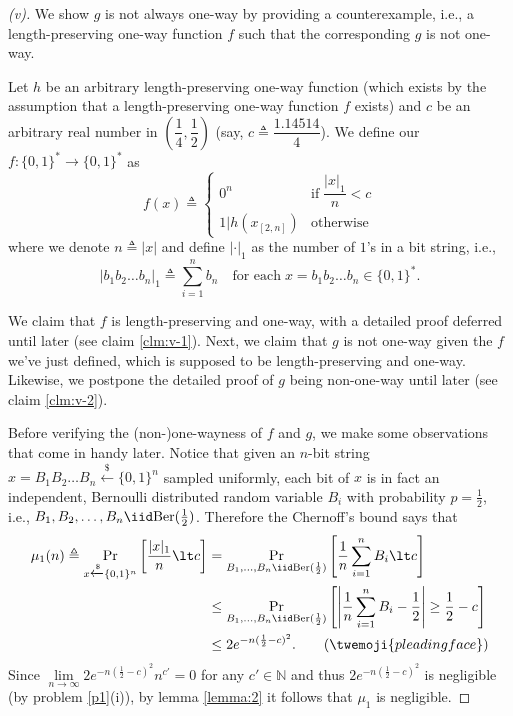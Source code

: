 \begin{proof}[(v)]
    We show $g$ is not always one-way by providing a counterexample, i.e., a length-preserving one-way function $f$ such that the corresponding $g$ is not one-way.
    
    Let $h$ be an arbitrary length-preserving one-way function (which exists by the assumption that a length-preserving one-way function $f$ exists) and $c$ be an arbitrary real number in $\left(\dfrac{1}{4},\dfrac{1}{2}\right)$ (say, $c\triangleq \dfrac{1.14514}{4}$). We define our $f:\{0,1\}^\ast\to \{0,1\}^\ast$ as
    \[
    f(x)\triangleq \begin{cases}
        0^{n} & \text{if}\; \dfrac{|x|_1}{n} \lt c \\
        1|h(x_{[2,n]}) & \text{otherwise}
    \end{cases}
    \]
    where we denote $n\triangleq |x|$ and define $|\cdot |_1$ as the number of $1$'s in a bit string, i.e.,
    \[
    |b_1b_2\ldots b_n|_1 \triangleq \sum_{i=1}^n b_n\quad \text{for each}\; x=b_1b_2\ldots b_n\in \{0,1\}^\ast.
    \]

    
    
    We claim that $f$ is length-preserving and one-way, with a detailed proof deferred until later (see claim \ref{clm:v-1}). Next, we claim that $g$ is not one-way given the $f$ we've just defined, which is supposed to be length-preserving and one-way. Likewise, we postpone the detailed proof of $g$ being non-one-way until later (see claim \ref{clm:v-2}).
    
    
    Before verifying the (non-)one-wayness of $f$ and $g$, we make some observations that come in handy later. Notice that given an $n$-bit string $x=B_1B_2\ldots B_n\xleftarrow{\$}\{0,1\}^n$ sampled uniformly, each bit of $x$ is in fact an independent, Bernoulli distributed random variable $B_i$ with probability $p=\frac{1}{2}$, i.e., $B_1,B_2,\ldots, B_n \iid \mathrm{Ber}(\frac{1}{2})$. Therefore the Chernoff's bound says that
    \begin{align*}
    \mu_1(n)\triangleq \Pr\limits_{x\xleftarrow{\$}\{0,1\}^n}\left[\dfrac{|x|_1}{n}\lt c\right]
    &= \Pr\limits_{B_1,\ldots, B_n \iid \mathrm{Ber}(\frac{1}{2})}\left[\frac{1}{n} \sum_{i=1}^n B_i\lt c\right]\\
    &\le \Pr\limits_{B_1,\ldots, B_n \iid \mathrm{Ber}(\frac{1}{2})}\left[\left|\frac{1}{n} \sum_{i=1}^n B_i - \frac{1}{2} \right|\ge \frac{1}{2}- c\right]\\
    &\le 2e^{-n (\frac{1}{2}- c)^2}. \tag{$\twemoji{pleading face}$}
    \end{align*}
    Since $\lim\limits_{n\to\infty}2e^{-n (\frac{1}{2}- c)^2}n^{c'}=0$ for any $c'\in\mathbb{N}$ and thus $2e^{-n (\frac{1}{2}- c)^2}$ is negligible (by problem \ref{p1}(i)), by lemma \ref{lemma:2} it follows that $\mu_1$ is negligible.
    

\end{proof}
